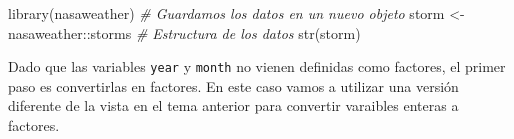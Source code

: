 \documentclass[
]{book}
\newenvironment{Shaded}{\begin{snugshade}}{\end{snugshade}}
\newcommand{\CommentTok}[1]{\textcolor[rgb]{0.56,0.35,0.01}{\textit{#1}}}
\newcommand{\DecValTok}[1]{\textcolor[rgb]{0.00,0.00,0.81}{#1}}
\newcommand{\FunctionTok}[1]{\textcolor[rgb]{0.00,0.00,0.00}{#1}}
\newcommand{\NormalTok}[1]{#1}
\newcommand{\OtherTok}[1]{\textcolor[rgb]{0.56,0.35,0.01}{#1}}
\newcommand{\SpecialCharTok}[1]{\textcolor[rgb]{0.00,0.00,0.00}{#1}}
\newcommand{\StringTok}[1]{\textcolor[rgb]{0.31,0.60,0.02}{#1}}
\begin{document}
\begin{Shaded}
\begin{Highlighting}[]
\FunctionTok{library}\NormalTok{(nasaweather)}
\CommentTok{\# Guardamos los datos en un nuevo objeto}
\NormalTok{storm }\OtherTok{\textless{}{-}}\NormalTok{ nasaweather}\SpecialCharTok{::}\NormalTok{storms }
\CommentTok{\# Estructura de los datos}
\FunctionTok{str}\NormalTok{(storm)}
\end{Highlighting}
\end{Shaded}

Dado que las variables \texttt{year} y \texttt{month} no vienen definidas como factores, el primer paso es convertirlas en factores. En este caso vamos a utilizar una versión diferente de la vista en el tema anterior para convertir varaibles enteras a factores.

\begin{Shaded}
\end{Shaded}
\end{document}
